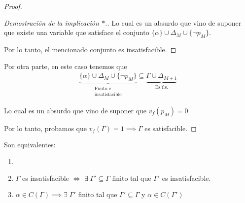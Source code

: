 \begin{itemize}[align=right]
\begin{enumerate}
\begin{proof}
\begin{enumerate}
\begin{proof}[Demostración de la implicación $*$.]
                    Lo cual es un absurdo que vino de suponer que existe una
                    variable que satisface  el conjunto
                    $\{ \alpha \} \cup \Delta_M \cup \{ \neg p_M \}$. 

                    Por lo tanto, el mencionado conjunto es insatisfacible.

                    \end{proof}

                    \bigskip

                    Por otra parte, en este caso tenemos que
                    \begin{gather*}
                        \underbrace{\{ \alpha \} \cup \Delta_M 
                        \cup \{ \neg p_M \}}_{\substack{\text{Finito e} \\
                        \text{insatisfacible}}}
                        \subseteq \underbrace{\Gamma \cup 
                        \Delta_{M+1}}_{\text{Es f.s.}}
                    \end{gather*}

                    Lo cual es un absurdo que vino de suponer que $v_f(p_M)=0$

                \end{enumerate}

                Por lo tanto, probamos que $v_f(\Gamma)= 1 \implies \Gamma$ es
                satisfacible.

                \end{proof}
       \end{enumerate} 
\end{itemize}

\begin{proposicion}{}{}
    Son equivalentes:
    \begin{enumerate}[label=\protect\circled{\arabic*}]
        \item {}
        \item $\Gamma$ es insatisfacible 
            $\iff$ $\exists \; \Gamma' \subseteq \Gamma$ 
            finito tal que $\Gamma'$ es insatisfacible.
        \item $\alpha \in C(\Gamma) \implies 
            \exists \; \Gamma'$ finito tal que $\Gamma' \subseteq \Gamma$ y
            $\alpha \in C(\Gamma')$
    \end{enumerate}
\end{proposicion}

